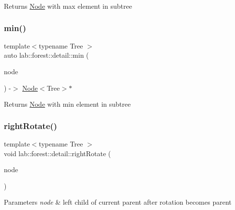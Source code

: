 \begin{DoxyReturn}{Returns}
\hyperlink{structlab_1_1forest_1_1detail_1_1Node}{Node} with max element in subtree 
\end{DoxyReturn}
\mbox{\label{namespacelab_1_1forest_1_1detail_a56c6d104e669b3ae029cf7ddbd79e72f}} 
\subsubsection{\texorpdfstring{min()}{min()}}
{\footnotesize\ttfamily template$<$typename Tree $>$ \\
auto lab\+::forest\+::detail\+::min (\begin{DoxyParamCaption}\item[{\hyperlink{structlab_1_1forest_1_1detail_1_1Node}{Node}$<$ Tree $>$ $\ast$}]{node }\end{DoxyParamCaption}) -\/$>$ \hyperlink{structlab_1_1forest_1_1detail_1_1Node}{Node}$<$Tree$>$$\ast$ \hspace{0.3cm}{\ttfamily [noexcept]}}

\begin{DoxyReturn}{Returns}
\hyperlink{structlab_1_1forest_1_1detail_1_1Node}{Node} with min element in subtree 
\end{DoxyReturn}
\mbox{\label{namespacelab_1_1forest_1_1detail_aaf762170657e2de7273548d147d2d913}} 
\subsubsection{\texorpdfstring{right\+Rotate()}{rightRotate()}}
{\footnotesize\ttfamily template$<$typename Tree $>$ \\
void lab\+::forest\+::detail\+::right\+Rotate (\begin{DoxyParamCaption}\item[{\hyperlink{structlab_1_1forest_1_1detail_1_1Node}{Node}$<$ Tree $>$ $\ast$}]{node }\end{DoxyParamCaption})}


\begin{DoxyParams}{Parameters}
{\em node} & left child of current parent after rotation becomes parent \\
\hline
\end{DoxyParams}
\mbox{\label{namespacelab_1_1forest_1_1detail_a77eddeb28a75cfb0360c39c0146b1827}} 
